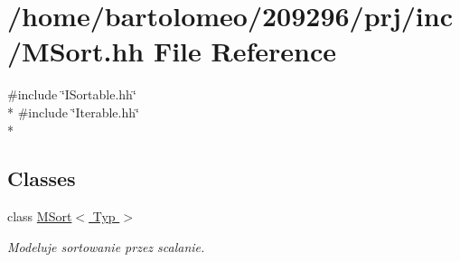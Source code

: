 \hypertarget{_m_sort_8hh}{\section{/home/bartolomeo/209296/prj/inc/\-M\-Sort.hh File Reference}
\label{_m_sort_8hh}
}
{\ttfamily \#include \char`\"{}I\-Sortable.\-hh\char`\"{}}\\*
{\ttfamily \#include \char`\"{}Iterable.\-hh\char`\"{}}\\*
\subsection*{Classes}
\begin{DoxyCompactItemize}
\item 
class \hyperlink{class_m_sort}{M\-Sort$<$ Typ $>$}
\begin{DoxyCompactList}\small\item\em Modeluje sortowanie przez scalanie. \end{DoxyCompactList}\end{DoxyCompactItemize}
